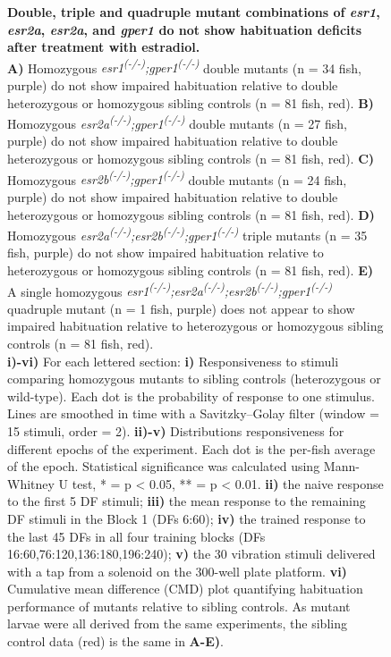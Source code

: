 \documentclass[10pt,lineno]{RandlettLab_elife}
\begin{document}
{\begin{figure}
\begin{fullwidth}
\begin{center}
\caption{ \textbf{Double, triple and quadruple mutant combinations of \emph{esr1}, \emph{esr2a}, \emph{esr2a}, and \emph{gper1} do not show habituation deficits after treatment with estradiol.} \scriptsize
\\ \textbf{A)} Homozygous \emph{esr1\textsuperscript{(-/-)};gper1\textsuperscript{(-/-)}} double mutants (n = 34 fish, purple) do not show impaired habituation relative to double heterozygous or homozygous sibling controls (n = 81 fish, red). 
\textbf{B)} Homozygous \emph{esr2a\textsuperscript{(-/-)};gper1\textsuperscript{(-/-)}} double mutants (n = 27 fish, purple) do not show impaired habituation relative to double heterozygous or homozygous sibling controls (n = 81 fish, red). 
\textbf{C)} Homozygous \emph{esr2b\textsuperscript{(-/-)};gper1\textsuperscript{(-/-)}} double mutants (n = 24 fish, purple) do not show impaired habituation relative to double heterozygous or homozygous sibling controls (n = 81 fish, red). 
\textbf{D)} Homozygous \emph{esr2a\textsuperscript{(-/-)};esr2b\textsuperscript{(-/-)};gper1\textsuperscript{(-/-)}} triple mutants (n = 35 fish, purple) do not show impaired habituation relative to heterozygous or homozygous sibling controls (n = 81 fish, red). 
\textbf{E)} A single homozygous \emph{esr1\textsuperscript{(-/-)};esr2a\textsuperscript{(-/-)};esr2b\textsuperscript{(-/-)};gper1\textsuperscript{(-/-)}} quadruple mutant (n = 1 fish, purple) does not appear to show impaired habituation relative to heterozygous or homozygous sibling controls (n = 81 fish, red). 
\\ \textbf{i)-vi)} For each lettered section: 
\textbf{i)} Responsiveness to stimuli comparing homozygous mutants to sibling controls (heterozygous or wild-type). 
Each dot is the probability of response to one stimulus. Lines are smoothed in time with a Savitzky–Golay filter (window = 15 stimuli, order = 2).
\textbf{ii)-v)} Distributions responsiveness for different epochs of the experiment. Each dot is the per-fish average of the epoch. 
Statistical significance was calculated using Mann-Whitney U test, * = p < 0.05, ** = p < 0.01.
\textbf{ii)} the naive response to the first 5 DF stimuli; \textbf{iii)} the mean response to the remaining DF stimuli in the Block 1 (DFs 6:60); \textbf{iv)} the trained response to the last 45 DFs in all four training blocks (DFs 16:60,76:120,136:180,196:240); \textbf{v)} the 30 vibration stimuli delivered with a tap from a solenoid on the 300-well plate platform.
\textbf{vi)} Cumulative mean difference (CMD) plot quantifying habituation performance of mutants relative to sibling controls. 
As mutant larvae were all derived from the same experiments, the sibling control data (red) is the same in \textbf{A-E)}.
}


\end{center}
\end{fullwidth}
\end{figure}}
\end{document}
